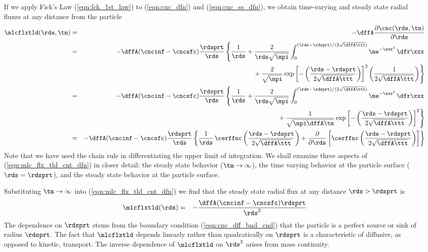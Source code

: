 \documentclass[12pt,twoside]{book}
\begin{document}
If we apply Fick's Law (\ref{eqn:fck_1st_law}) to (\ref{eqn:cnc_dfn})
and (\ref{eqn:cnc_ss_dfn}), we obtain time-varying and steady state
radial fluxes at any distance from the particle
\begin{eqnarray}
\mlcflxtld(\rds,\tm) & = & 
- \dffA \frac{\partial \cnc(\rds,\tm)}{\partial \rds } \nonumber \\
& = & 
- \dffA ( \cncinf - \cncsfc ) \frac{\rdsprt}{\rds }
\left\{ \frac{1}{\rds} + \frac{2}{\rds \sqrt { \mpi } } 
\int_{0}^{ (\rds - \rdsprt ) / ( 2 \sqrt { \dffA \ttt } ) }
\me^{ - \xxx^{2} } \,\dfr\xxx \right. \nonumber \\
& & \left. {} + \frac{2}{\sqrt{ \mpi } } 
\exp \left[ - \left( \frac{\rds - \rdsprt}{2 \sqrt { \dffA \ttt } }
\right) \right]^{2} 
\left( \frac{1}{2 \sqrt { \dffA \ttt } } \right)
\right\} \nonumber \\
& = & 
\label{eqn:mlc_flx_tld_cnt_dfn}
- \dffA ( \cncinf - \cncsfc ) \frac{\rdsprt}{\rds }
\left\{ \frac{1}{\rds} + \frac{2}{\rds \sqrt { \mpi } } 
\int_{0}^{ (\rds - \rdsprt ) / ( 2 \sqrt { \dffA \ttt } ) }
\me^{ - \xxx^{2} } \,\dfr\xxx \right. \nonumber \\
& & \left. {} + \frac{1}{\sqrt{ \mpi \dffA \tm } } 
\exp \left[ - \left( \frac{\rds - \rdsprt}{2 \sqrt { \dffA \ttt } }
\right) \right]^{2} 
\right\} \nonumber \\
& = & 
\label{eqn:mlc_flx_tld_cnt_cerf_dfn}
- \dffA ( \cncinf - \cncsfc ) \frac{\rdsprt}{\rds } 
\left\{
\frac{1}{\rds } \,
\cerffnc \left( \frac{\rds - \rdsprt}{2 \sqrt { \dffA \ttt } } \right)
+
\frac{\partial}{\partial \rds } \left[ \cerffnc \left( \frac{\rds
- \rdsprt}{2 \sqrt { \dffA \ttt } } \right) \right]
\right\}
\end{eqnarray}
Note that we have used the chain rule in differentiating the upper
limit of integration.
We shall examine three aspects of (\ref{eqn:mlc_flx_tld_cnt_dfn})
in closer detail: the steady state behavior ($\tm \rightarrow
\infty$), the time varying behavior at the particle surface ($\rds =
\rdsprt$), and the steady state behavior at the particle surface.

Substituting $\tm \rightarrow \infty$ into
(\ref{eqn:mlc_flx_tld_cnt_dfn}) we find that the steady state radial
flux at any distance $\rds > \rdsprt$ is 
\begin{eqnarray}
\mlcflxtld(\rds) & = & - \frac{\dffA ( \cncinf - \cncsfc ) \rdsprt}{\rds^{2} }
\label{eqn:mlc_flx_tld_cnt_ss_dfn}
\end{eqnarray}
The dependence on $\rdsprt$ stems from the boundary condition
(\ref{eqn:cnc_dff_bnd_cnd}) that the particle is a perfect source or
sink of radius $\rdsprt$. 
The fact that $\mlcflxtld$ depends linearly rather than quadratically
on $\rdsprt$ is a characteristic of diffusive, as opposed to kinetic,
transport.
The inverse dependence of $\mlcflxtld$ on $\rds^{2}$ arises from mass
continuity. 
\end{document}
